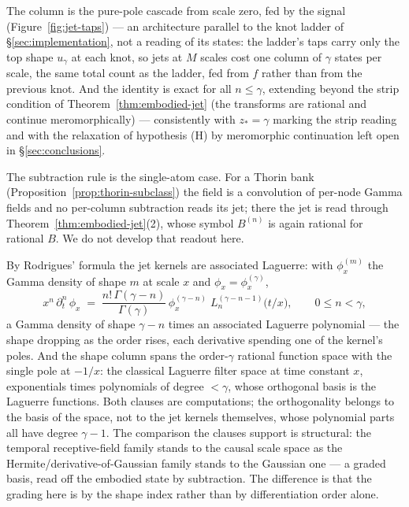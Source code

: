 The column is the pure-pole cascade from scale zero, fed by the signal
(Figure~\ref{fig:jet-taps}) --- an architecture parallel to the knot ladder of
\S\ref{sec:implementation}, not a reading of its states: the ladder's taps carry only the
top shape $u_\gamma$ at each knot, so jets at $M$ scales cost one column of $\gamma$ states
per scale, the same total count as the ladder, fed from $f$ rather than from the previous
knot. And the identity is exact for all $n \le \gamma$, extending beyond the strip
condition of Theorem~\ref{thm:embodied-jet} (the transforms are rational and continue
meromorphically) --- consistently with $z_* = \gamma$ marking the strip reading and with
the relaxation of hypothesis (H) by meromorphic continuation left open in
\S\ref{sec:conclusions}.

The subtraction rule is the single-atom case. For a Thorin bank
(Proposition~\ref{prop:thorin-subclass}) the field is a convolution of per-node Gamma
fields and no per-column subtraction reads its jet; there the jet is read through
Theorem~\ref{thm:embodied-jet}(2), whose symbol $B^{(n)}$ is again rational for rational
$B$. We do not develop that readout here.

\begin{remark}\label{rem:laguerre}
By Rodrigues' formula the jet kernels are associated Laguerre: with $\phi^{(m)}_x$ the
Gamma density of shape $m$ at scale $x$ and $\phi_x = \phi^{(\gamma)}_x$,
\[
  x^n\,\partial_t^n\, \phi_x \;=\; \frac{n!\,\Gamma(\gamma - n)}{\Gamma(\gamma)}\,
  \phi^{(\gamma - n)}_x\; L_n^{(\gamma - n - 1)}\!\bigl(t/x\bigr),
  \qquad 0 \le n < \gamma,
\]
a Gamma density of shape $\gamma - n$ times an associated Laguerre polynomial --- the
shape dropping as the order rises, each derivative spending one of the kernel's poles.
And the shape column spans the order-$\gamma$ rational function space with the single
pole at $-1/x$: the classical Laguerre filter space at time constant $x$, exponentials
times polynomials of degree $< \gamma$, whose orthogonal basis is the Laguerre
functions. Both clauses are computations; the orthogonality belongs to the basis of the
space, not to the jet kernels themselves, whose polynomial parts all have degree
$\gamma - 1$. The comparison the clauses support is structural: the temporal
receptive-field family stands to the causal scale space
as the Hermite/derivative-of-Gaussian family stands to the Gaussian one --- a graded basis,
read off the embodied state by subtraction. The difference is that the grading here is
by the shape index rather than by differentiation order alone.
\end{remark}


